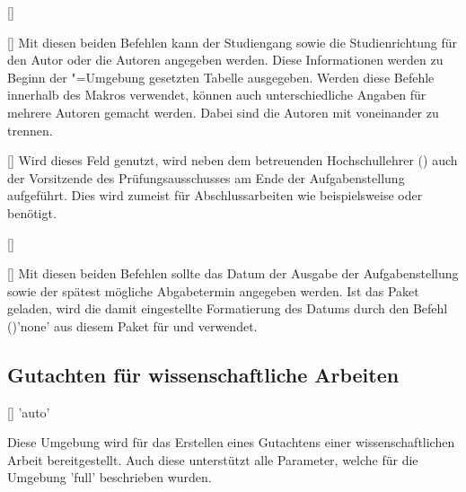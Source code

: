 \begin{Bundle*}{}
\begin{Declaration}{[]}
\begin{Declaration}[v2.02]{[]}
\printdeclarationlist%
%
%
Mit diesen beiden Befehlen kann der Studiengang sowie die Studienrichtung für 
den Autor oder die Autoren angegeben werden. Diese Informationen werden zu 
Beginn der "=Umgebung gesetzten Tabelle ausgegeben. Werden 
diese Befehle innerhalb des Makros  verwendet, können auch 
unterschiedliche Angaben für mehrere Autoren gemacht werden. Dabei sind die 
Autoren mit  voneinander zu trennen.
\end{Declaration}
\end{Declaration}

\begin{Declaration}{[]}
\printdeclarationlist%
%
Wird dieses Feld genutzt, wird neben dem betreuenden Hochschullehrer 
() auch der Vorsitzende des Prüfungsausschusses am Ende der 
Aufgabenstellung aufgeführt. Dies wird zumeist für Abschlussarbeiten wie 
beispielsweise \masterthesisname{} oder \diplomathesisname{} benötigt.
\end{Declaration}

\begin{Declaration}{[]}
\begin{Declaration}{[]}
\printdeclarationlist%
%
Mit diesen beiden Befehlen sollte das Datum der Ausgabe der Aufgabenstellung 
sowie der spätest mögliche Abgabetermin angegeben werden. Ist das Paket 
 geladen, wird die damit eingestellte Formatierung des Datums 
durch den Befehl ()'none' aus diesem Paket 
für  und  verwendet.
\end{Declaration}
\end{Declaration}


\subsection{Gutachten für wissenschaftliche Arbeiten}
%
%
\begin{Declaration}{[]}{%
  'auto'%
}
\begin{Declaration}{%
}
\begin{Declaration}{}
\printdeclarationlist%
%
Diese Umgebung wird für das Erstellen eines Gutachtens einer wissenschaftlichen 
Arbeit bereitgestellt. Auch diese unterstützt alle Parameter, welche für die 
Umgebung 'full' beschrieben wurden.


\end{Declaration}
\end{Declaration}
\end{Declaration}
\end{Bundle*}
